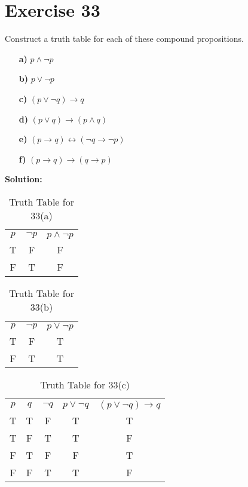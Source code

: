 \documentclass{Axon}
\begin{document}
\section*{Exercise 33}
Construct a truth table for each of these compound propositions.
\begin{enumerate}
    \item[\textbf{a)}] \(p \land \lnot p\)
    \item[\textbf{b)}] \(p \lor \lnot p\)
    \item[\textbf{c)}] \((p \lor \lnot q) \to q\)
    \item[\textbf{d)}] \((p \lor q) \to (p \land q)\)
    \item[\textbf{e)}] \((p \to q) \leftrightarrow (\lnot q \to \lnot p)\)
    \item[\textbf{f)}] \((p \to q) \to (q \to p)\)
\end{enumerate}

\noindent
\textbf{Solution:}
\begin{table}[h]
    \centering
    \begin{tabular}{c|c|c}
        \(p\) & \(\lnot p\) & \(p \land \lnot p\) \\
        T     & F           & F                   \\
        F     & T           & F
    \end{tabular}
    \caption{Truth Table for 33(a)}
\end{table}

\begin{table}[h]
    \centering
    \begin{tabular}{c|c|c}
        \(p\) & \(\lnot p\) & \(p \lor \lnot p\) \\
        T     & F           & T                  \\
        F     & T           & T
    \end{tabular}
    \caption{Truth Table for 33(b)}
\end{table}

\begin{table}[h]
    \centering
    \begin{tabular}{c|c|c|c|c}
        \(p\) & \(q\) & \(\lnot q\) & \(p \lor \lnot q\) & \((p \lor \lnot q) \to q\) \\
        T     & T     & F           & T                  & T                          \\
        T     & F     & T           & T                  & F                          \\
        F     & T     & F           & F                  & T                          \\
        F     & F     & T           & T                  & F                        
    \end{tabular}
    \caption{Truth Table for 33(c)}
\end{table}
\end{document}
